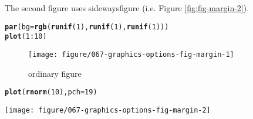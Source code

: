 \documentclass{article}\usepackage[]{graphicx}\usepackage[]{xcolor}
\makeatletter
\newcommand{\hlnum}[1]{\textcolor[rgb]{0.686,0.059,0.569}{#1}}%
\newcommand{\hlopt}[1]{\textcolor[rgb]{0,0,0}{#1}}%
\newcommand{\hlstd}[1]{\textcolor[rgb]{0.345,0.345,0.345}{#1}}%
\newcommand{\hlkwc}[1]{\textcolor[rgb]{0.333,0.667,0.333}{#1}}%
\newcommand{\hlkwd}[1]{\textcolor[rgb]{0.737,0.353,0.396}{\textbf{#1}}}%
\newenvironment{kframe}{%
 \def\at@end@of@kframe{}%
 \ifinner\ifhmode%
  \def\at@end@of@kframe{\end{minipage}}%
  \begin{minipage}{\columnwidth}%
 \fi\fi%
 \def\FrameCommand##1{\hskip\@totalleftmargin \hskip-\fboxsep
 \colorbox{shadecolor}{##1}\hskip-\fboxsep
     \hskip-\linewidth \hskip-\@totalleftmargin \hskip\columnwidth}%
 \MakeFramed {\advance\hsize-\width
   \@totalleftmargin\z@ \linewidth\hsize
   \@setminipage}}%
 {\par\unskip\endMakeFramed%
 \at@end@of@kframe}
\newenvironment{knitrout}{}{} %
\makeatother
\begin{document}
The second figure uses sidewaysfigure (i.e. Figure \ref{fig:fig-margin-2}).

\begin{knitrout}
\color{fgcolor}\begin{kframe}
\begin{alltt}
\hlkwd{par}\hlstd{(}\hlkwc{bg} \hlstd{=} \hlkwd{rgb}\hlstd{(}\hlkwd{runif}\hlstd{(}\hlnum{1}\hlstd{),} \hlkwd{runif}\hlstd{(}\hlnum{1}\hlstd{),} \hlkwd{runif}\hlstd{(}\hlnum{1}\hlstd{)))}
\hlkwd{plot}\hlstd{(}\hlnum{1}\hlopt{:}\hlnum{10}\hlstd{)}
\end{alltt}
\end{kframe}\begin{figure}[H]
\texttt{[image: figure/067-graphics-options-fig-margin-1]} \caption[ordinary figure]{ordinary figure}\label{fig:fig-margin-1}
\end{figure}

\begin{kframe}\begin{alltt}
\hlkwd{plot}\hlstd{(}\hlkwd{rnorm}\hlstd{(}\hlnum{10}\hlstd{),} \hlkwc{pch} \hlstd{=} \hlnum{19}\hlstd{)}
\end{alltt}
\end{kframe}\begin{sidewaysfigure}[H]
\texttt{[image: figure/067-graphics-options-fig-margin-2]} \caption[sideways figure]{sideways figure}\label{fig:fig-margin-2}
\end{sidewaysfigure}

\end{knitrout}
\end{document}
